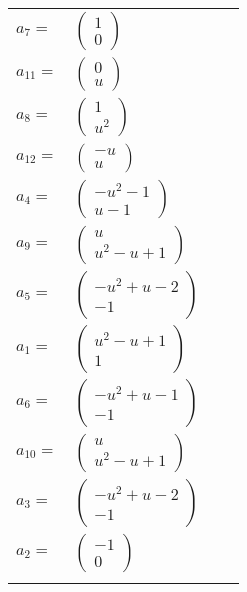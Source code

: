 \documentclass[1p]{elsarticle_modified}
\theoremstyle{definition}
\begin{document}
\begin{tabular}{m{7pt} m{180pt} m{7pt} m{180pt} }
\flushright $a_{7}=$&$\begin{pmatrix}1\\0\end{pmatrix}$ \\
\flushright $a_{11}=$&$\begin{pmatrix}0\\u\end{pmatrix}$ \\
\flushright $a_{8}=$&$\begin{pmatrix}1\\u^2\end{pmatrix}$ \\
\flushright $a_{12}=$&$\begin{pmatrix}- u\\u\end{pmatrix}$ \\
\flushright $a_{4}=$&$\begin{pmatrix}- u^2-1\\u-1\end{pmatrix}$ \\
\flushright $a_{9}=$&$\begin{pmatrix}u\\u^2- u+1\end{pmatrix}$ \\
\flushright $a_{5}=$&$\begin{pmatrix}- u^2+u-2\\-1\end{pmatrix}$ \\
\flushright $a_{1}=$&$\begin{pmatrix}u^2- u+1\\1\end{pmatrix}$ \\
\flushright $a_{6}=$&$\begin{pmatrix}- u^2+u-1\\-1\end{pmatrix}$ \\
\flushright $a_{10}=$&$\begin{pmatrix}u\\u^2- u+1\end{pmatrix}$ \\
\flushright $a_{3}=$&$\begin{pmatrix}- u^2+u-2\\-1\end{pmatrix}$ \\
\flushright $a_{2}=$&$\begin{pmatrix}-1\\0\end{pmatrix}$\\&\end{tabular}
\end{document}
